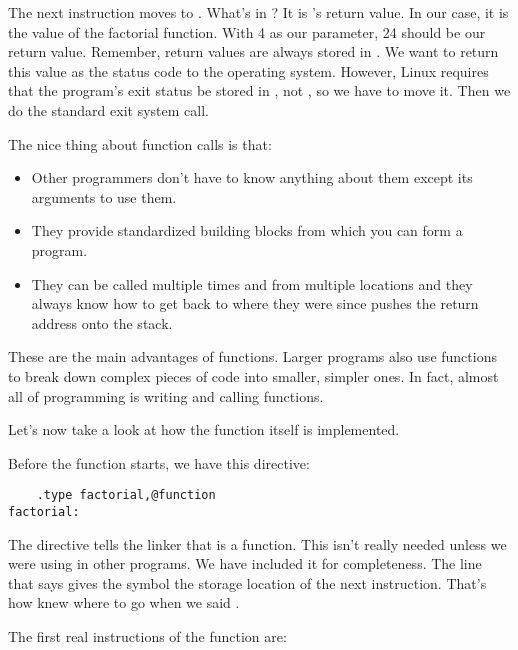 The next instruction moves {\eaxReg} to
{\ebxReg}.  What's in {\eaxRegIdx}?  It is
's return value.  
In our case, it is the value of the factorial function.  With 4 as our
parameter, 24 should be our return value.  Remember, return values are
always stored in {\eaxRegIdx}.  We want to return this value as the
status code to the operating system.  However,
Linux requires that the program's exit status be stored in
{\ebxRegIdx}, not {\eaxReg}, so we have to
move it.  Then we do the standard exit system call.

The nice thing about function calls is that:

\begin{itemize}
\item Other programmers don't have to know anything about them except its arguments to use them. 
\item They provide standardized building blocks from which you can form a program. 
\item They can be called multiple times and from multiple locations and they always know how to get back to where they were since  pushes the return address onto the stack. 
\end{itemize}

These are the main advantages of functions.  
Larger programs also use functions to break 
down complex pieces of code into smaller, simpler ones.  In fact, almost
all of programming is writing and calling functions. 

Let's now take a look at how the  
function itself is implemented.

Before the function starts, we have this directive:

\begin{simpletyping}
\begin{lstlisting}
	.type factorial,@function
factorial:
\end{lstlisting}
\end{simpletyping}

The  directive tells the linker that 
 is a function.  This isn't really needed
unless we were using  in other programs.
We have included it for completeness.  The line that says 
 gives the symbol 
the storage location of the next instruction.  That's how 
 knew where to go when we said 
.  

The first real instructions of the function are:

